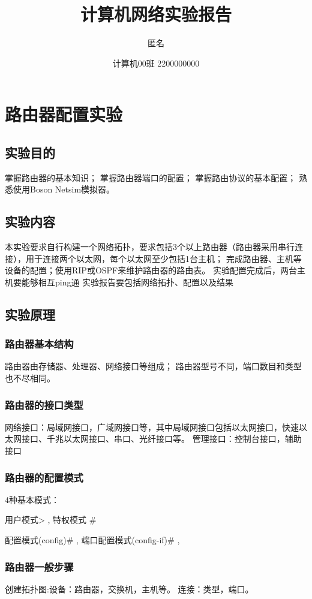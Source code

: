 \documentclass{article}
\title{计算机网络实验报告}
\author{匿名}
\date{计算机00班 2200000000}
\begin{document}
\maketitle

\section{路由器配置实验}
\subsection{实验目的}
掌握路由器的基本知识；
掌握路由器端口的配置；
掌握路由协议的基本配置；
熟悉使用Boson Netsim模拟器。

\subsection{实验内容}
本实验要求自行构建一个网络拓扑，要求包括3个以上路由器（路由器采用串行连接），用于连接两个以太网，每个以太网至少包括1台主机；
完成路由器、主机等设备的配置；使用RIP或OSPF来维护路由器的路由表。 
实验配置完成后，两台主机要能够相互ping通
实验报告要包括网络拓扑、配置以及结果

\subsection{实验原理}
\subsubsection{路由器基本结构}

路由器由存储器、处理器、网络接口等组成；
路由器型号不同，端口数目和类型也不尽相同。

\subsubsection{路由器的接口类型}

网络接口：局域网接口，广域网接口等，其中局域网接口包括以太网接口，快速以太网接口、千兆以太网接口、串口、光纤接口等。
管理接口：控制台接口，辅助接口
\subsubsection{路由器的配置模式}
4种基本模式：\par
用户模式> ,
特权模式 \# 

配置模式(config)\# ,
端口配置模式(config-if)\# ,

\subsubsection{路由器一般步骤}
创建拓扑图:设备：路由器，交换机，主机等。
连接：类型，端口。
\par
\end{document}
